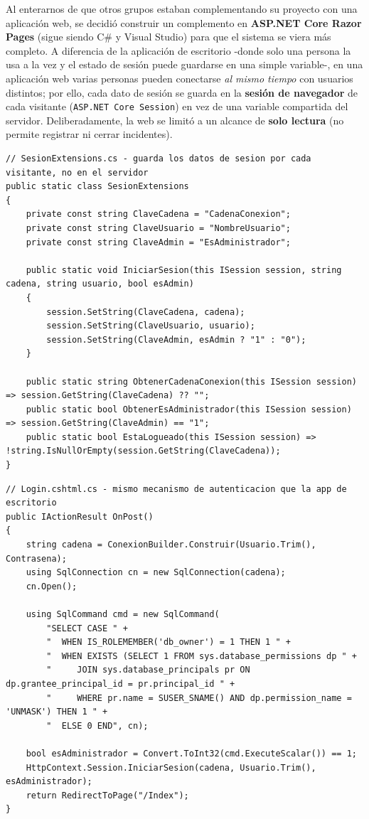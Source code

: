 \documentclass[11pt,a4paper]{article}
\begin{document}
Al enterarnos de que otros grupos estaban complementando su proyecto con una
aplicación web, se decidió construir un complemento en \textbf{ASP.NET Core Razor
Pages} (sigue siendo C\# y Visual Studio) para que el sistema se viera más completo.
A diferencia de la aplicación de escritorio -donde solo una persona la usa a la vez y
el estado de sesión puede guardarse en una simple variable-, en una aplicación web
varias personas pueden conectarse \emph{al mismo tiempo} con usuarios distintos; por
ello, cada dato de sesión se guarda en la \textbf{sesión de navegador} de cada
visitante (\texttt{ASP.NET Core Session}) en vez de una variable compartida del
servidor. Deliberadamente, la web se limitó a un alcance de \textbf{solo lectura}
(no permite registrar ni cerrar incidentes).

\begin{lstlisting}[style=codestyle]
// SesionExtensions.cs - guarda los datos de sesion por cada visitante, no en el servidor
public static class SesionExtensions
{
    private const string ClaveCadena = "CadenaConexion";
    private const string ClaveUsuario = "NombreUsuario";
    private const string ClaveAdmin = "EsAdministrador";

    public static void IniciarSesion(this ISession session, string cadena, string usuario, bool esAdmin)
    {
        session.SetString(ClaveCadena, cadena);
        session.SetString(ClaveUsuario, usuario);
        session.SetString(ClaveAdmin, esAdmin ? "1" : "0");
    }

    public static string ObtenerCadenaConexion(this ISession session) => session.GetString(ClaveCadena) ?? "";
    public static bool ObtenerEsAdministrador(this ISession session) => session.GetString(ClaveAdmin) == "1";
    public static bool EstaLogueado(this ISession session) => !string.IsNullOrEmpty(session.GetString(ClaveCadena));
}
\end{lstlisting}

\begin{lstlisting}[style=codestyle]
// Login.cshtml.cs - mismo mecanismo de autenticacion que la app de escritorio
public IActionResult OnPost()
{
    string cadena = ConexionBuilder.Construir(Usuario.Trim(), Contrasena);
    using SqlConnection cn = new SqlConnection(cadena);
    cn.Open();

    using SqlCommand cmd = new SqlCommand(
        "SELECT CASE " +
        "  WHEN IS_ROLEMEMBER('db_owner') = 1 THEN 1 " +
        "  WHEN EXISTS (SELECT 1 FROM sys.database_permissions dp " +
        "     JOIN sys.database_principals pr ON dp.grantee_principal_id = pr.principal_id " +
        "     WHERE pr.name = SUSER_SNAME() AND dp.permission_name = 'UNMASK') THEN 1 " +
        "  ELSE 0 END", cn);

    bool esAdministrador = Convert.ToInt32(cmd.ExecuteScalar()) == 1;
    HttpContext.Session.IniciarSesion(cadena, Usuario.Trim(), esAdministrador);
    return RedirectToPage("/Index");
}
\end{lstlisting}
\end{document}

